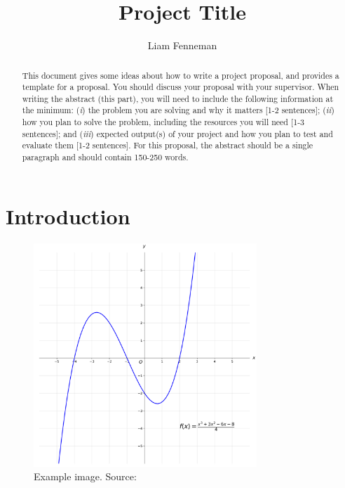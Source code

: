\documentclass[11pt, a4paper, oneside, openright]{article}
\title{Project Title}
\author{Liam Fenneman}
\date{}
\begin{document}
\frontmatter

\begin{abstract}
    This document gives some ideas about how to write a project proposal, and
    provides a template for a proposal. You should discuss your proposal with
    your supervisor. When writing the abstract (this part), you will need to
    include the following information at the minimum: (\textit{i}) the problem
    you are solving and why it matters [1-2 sentences]; (\textit{ii}) how you
    plan to solve the problem, including the resources you will need [1-3
    sentences]; and (\textit{iii}) expected output(s) of your project and how
    you plan to test and evaluate them [1-2 sentences]. For this proposal, the
    abstract should be a single paragraph and should contain 150-250 words.
\end{abstract}

\maketitle

\tableofcontents
{}

\mainmatter

\section{Introduction}

\begin{figure}[h]
    \centering
    \includegraphics[width=0.75\textwidth]{images/example}
    \caption{Example image. Source: \cite{example}}
    \label{fig:example}
\end{figure}
\end{document}

